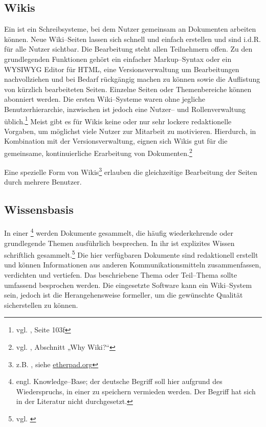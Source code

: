 \subsection{Wikis} %
\label{sub:wikis}
Ein  ist ein Schreibsysteme, bei dem Nutzer gemeinsam an Dokumenten arbeiten können. Neue Wiki--Seiten lassen sich schnell und einfach erstellen und sind i.d.R. für alle Nutzer sichtbar. Die Bearbeitung steht allen Teilnehmern offen. Zu den grundlegenden Funktionen gehört ein einfacher Markup--Syntax oder ein \ac{WYSIWYG} Editor für \ac{HTML}, eine Versionsverwaltung um Bearbeitungen nachvollziehen und bei Bedarf rückgängig machen zu können sowie die Auflistung von kürzlich bearbeiteten Seiten. Einzelne Seiten oder Themenbereiche können abonniert werden. Die ersten Wiki--Systeme waren ohne jegliche Benutzerhierarchie, inzwischen ist jedoch eine Nutzer– und Rollenverwaltung üblich.\footnote{vgl. \cite{cscl:ebner}, Seite 103f} Meist gibt es für Wikis keine oder nur sehr lockere redaktionelle Vorgaben, um möglichst viele Nutzer zur Mitarbeit zu motivieren. Hierdurch, in Kombination mit der Versionsverwaltung, eignen sich Wikis gut für die gemeinsame, kontinuierliche Erarbeitung von Dokumenten.\footnote{vgl. \cite{cunningham}, Abschnitt „Why Wiki?“}

Eine spezielle Form von Wikis\footnote{z.B. , siehe \url{etherpad.org}} erlauben die gleichzeitige Bearbeitung der Seiten durch mehrere Benutzer.

\subsection{Wissensbasis} %
\label{sub:knowledge_bases}
In einer \footnote{engl. Knowledge–Base; der deutsche Begriff  soll hier aufgrund des Wiederspruchs,  in einer  zu speichern vermieden werden. Der Begriff  hat sich in der Literatur nicht durchgesetzt.} werden Dokumente gesammelt, die häufig wiederkehrende oder grundlegende Themen ausführlich besprechen. In ihr ist explizites Wissen schriftlich gesammelt.\footnote{vgl. \cite{wp:kb}} Die hier verfügbaren Dokumente sind redaktionell erstellt und können Informationen aus  anderen Kommunikationsmitteln zusammenfassen, verdichten und vertiefen. Das beschriebene Thema oder Teil–Thema sollte umfassend besprochen werden. Die eingesetzte Software kann ein Wiki--System sein, jedoch ist die Herangehensweise formeller, um die gewünschte Qualität sicherstellen zu können. 

